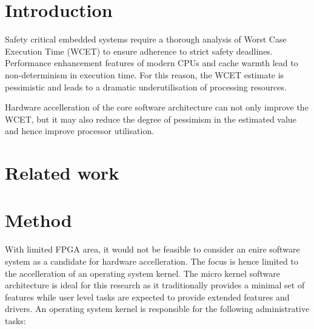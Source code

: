 \documentclass[10pt]{article}
\begin{document}
\maketitle



\section{Introduction}

Safety critical embedded systems require a thorough analysis of Worst Case Execution Time (WCET)
to ensure adherence to strict safety deadlines. Performance enhancement features of modern
CPUs and cache warmth lead to non-determinism in execution time. For this reason, the WCET estimate
is pessimistic and leads to a dramatic underutilisation of processing resources.

Hardware accelleration of the core software architecture can not only improve the WCET, but it may
also reduce the degree of pessimism in the estimated value and hence improve processor utilisation.

\section{Related work}

\section{Method}
With limited FPGA area, it would not be feasible to consider an enire software system as a candidate
for hardware accelleration. The focus is hence limited to the accelleration of an operating system
kernel. The micro kernel software architecture is ideal for this research as it traditionally provides
a minimal set of features while user level tasks are expected to provide extended features and drivers.
An operating system kernel is responsible for the following administrative tasks:
\end{document}
